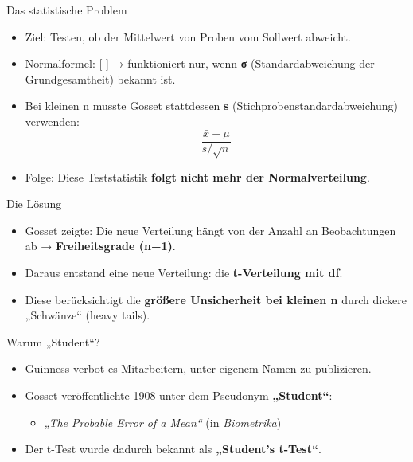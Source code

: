 \documentclass[
  ignorenonframetext,
]{beamer}
\providecommand{\tightlist}{%
  \setlength{\itemsep}{0pt}\setlength{\parskip}{0pt}}
\begin{document}
\begin{frame}{Das statistische Problem}
\protect{}\label{das-statistische-problem}
\begin{itemize}
\tightlist
\item
  Ziel: Testen, ob der Mittelwert von Proben vom Sollwert abweicht.
\item
  Normalformel: {[}  {]} →
  funktioniert nur, wenn \textbf{σ} (Standardabweichung der
  Grundgesamtheit) bekannt ist.
\item
  Bei kleinen n musste Gosset stattdessen \textbf{s}
  (Stichprobenstandardabweichung) verwenden:
  \[  \frac{\bar{x} - \mu}{s / \sqrt{n}}\]
\item
  Folge: Diese Teststatistik \textbf{folgt nicht mehr der
  Normalverteilung}.
\end{itemize}
\end{frame}

\begin{frame}{Die Lösung}
\protect{}\label{die-luxf6sung}
\begin{itemize}
\tightlist
\item
  Gosset zeigte: Die neue Verteilung hängt von der Anzahl an
  Beobachtungen ab → \textbf{Freiheitsgrade (n−1)}.
\item
  Daraus entstand eine neue Verteilung: die \textbf{t-Verteilung mit
  df}.
\item
  Diese berücksichtigt die \textbf{größere Unsicherheit bei kleinen n}
  durch dickere „Schwänze`` (heavy tails).
\end{itemize}
\end{frame}

\begin{frame}{Warum „Student``?}
\protect{}\label{warum-student}
\begin{itemize}
\tightlist
\item
  Guinness verbot es Mitarbeitern, unter eigenem Namen zu publizieren.
\item
  Gosset veröffentlichte 1908 unter dem Pseudonym \textbf{„Student``}:

  \begin{itemize}
  \tightlist
  \item
    \emph{„The Probable Error of a Mean``} (in \emph{Biometrika})
  \end{itemize}
\item
  Der t-Test wurde dadurch bekannt als \textbf{„Student's t-Test``}.
\end{itemize}
\end{frame}
\end{document}
